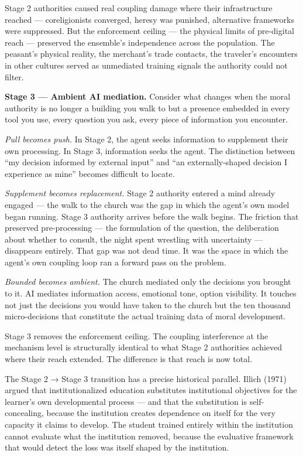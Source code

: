 \documentclass[
]{article}
\begin{document}
Stage 2 authorities caused real coupling damage where their
infrastructure reached --- coreligionists converged, heresy was
punished, alternative frameworks were suppressed. But the enforcement
ceiling --- the physical limits of pre-digital reach --- preserved the
ensemble's independence across the population. The peasant's physical
reality, the merchant's trade contacts, the traveler's encounters in
other cultures served as unmediated training signals the authority could
not filter.

\textbf{Stage 3 --- Ambient AI mediation.} Consider what changes when
the moral authority is no longer a building you walk to but a presence
embedded in every tool you use, every question you ask, every piece of
information you encounter.

\emph{Pull becomes push.} In Stage 2, the agent seeks information to
supplement their own processing. In Stage 3, information seeks the
agent. The distinction between ``my decision informed by external
input'' and ``an externally-shaped decision I experience as mine''
becomes difficult to locate.

\emph{Supplement becomes replacement.} Stage 2 authority entered a mind
already engaged --- the walk to the church was the gap in which the
agent's own model began running. Stage 3 authority arrives before the
walk begins. The friction that preserved pre-processing --- the
formulation of the question, the deliberation about whether to consult,
the night spent wrestling with uncertainty --- disappears entirely. That
gap was not dead time. It was the space in which the agent's own
coupling loop ran a forward pass on the problem.

\emph{Bounded becomes ambient.} The church mediated only the decisions
you brought to it. AI mediates information access, emotional tone,
option visibility. It touches not just the decisions you would have
taken to the church but the ten thousand micro-decisions that constitute
the actual training data of moral development.

Stage 3 removes the enforcement ceiling. The coupling interference at
the mechanism level is structurally identical to what Stage 2
authorities achieved where their reach extended. The difference is that
reach is now total.

The Stage 2 → Stage 3 transition has a precise historical parallel.
Illich (1971) argued that institutionalized education substitutes
institutional objectives for the learner's own developmental process ---
and that the substitution is self-concealing, because the institution
creates dependence on itself for the very capacity it claims to develop.
The student trained entirely within the institution cannot evaluate what
the institution removed, because the evaluative framework that would
detect the loss was itself shaped by the institution.
\end{document}
